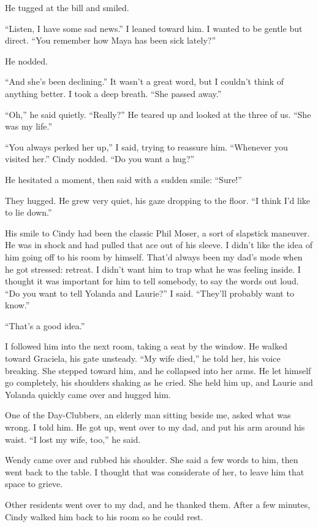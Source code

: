 \documentclass[12pt]{book}
\begin{document}
He tugged at the bill and smiled.

``Listen, I have some sad news.'' I leaned toward him. I wanted to be gentle but direct. ``You remember how Maya has been sick lately?''

He nodded.

``And she's been declining.'' It wasn't a great word, but I couldn't think of anything better. I took a deep breath. ``She passed away.''

``Oh,'' he said quietly. ``Really?'' He teared up and looked at the three of us. ``She was my life.''

``You always perked her up,'' I said, trying to reassure him. ``Whenever you visited her.'' Cindy nodded. ``Do you want a hug?''

He hesitated a moment, then said with a sudden smile: ``Sure!''

They hugged. He grew very quiet, his gaze dropping to the floor. ``I think I'd like to lie down.''

His smile to Cindy had been the classic Phil Moser, a sort of slapstick maneuver. He was in shock and had pulled that ace out of his sleeve. I didn't like the idea of him going off to his room by himself. That'd always been my dad's mode when he got stressed: retreat. I didn't want him to trap what he was feeling inside. I thought it was important for him to tell somebody, to say the words out loud. ``Do you want to tell Yolanda and Laurie?'' I said. ``They'll probably want to know.''

``That's a good idea.''

I followed him into the next room, taking a seat by the window. He walked toward Graciela, his gate unsteady. ``My wife died,'' he told her, his voice breaking. She stepped toward him, and he collapsed into her arms. He let himself go completely, his shoulders shaking as he cried. She held him up, and Laurie and Yolanda quickly came over and hugged him.

One of the Day-Clubbers, an elderly man sitting beside me, asked what was wrong. I told him. He got up, went over to my dad, and put his arm around his waist. ``I lost my wife, too,'' he said.

Wendy came over and rubbed his shoulder. She said a few words to him, then went back to the table. I thought that was considerate of her, to leave him that space to grieve.

Other residents went over to my dad, and he thanked them. After a few minutes, Cindy walked him back to his room so he could rest.
\end{document}
